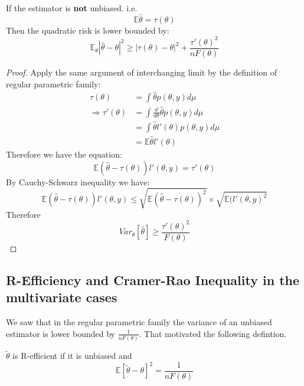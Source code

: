 \begin{corollary}
If the estimator is\textbf{ not} unbiased. i.e.
\begin{equation*}
	\mathbb{E}\hat{\theta} = \tau(\theta)
\end{equation*}
	Then the quadratic risk is lower bounded by:
	\begin{equation*}
		\mathbb{E}_\theta |\hat{\theta} - \theta |^2 \geq |\tau(\theta) - \theta|^2 + \frac{\tau'(\theta)^2}{n F(\theta)}
	\end{equation*}
\end{corollary}


\begin{proof}
	Apply the same argument of interchanging limit by the definition of regular parametric family:
	\begin{align*}
		\tau(\theta) &= \int \hat{\theta}p(\theta, y) d\mu\\
		\Rightarrow \tau'(\theta) &=\int \frac{d}{d\theta} \hat{\theta} p(\theta, y) d\mu\\
		&= \int \hat{\theta}l'(\theta)p(\theta, y) d\mu\\
		&= \mathbb{E} \hat{\theta}l'(\theta)
	\end{align*}
	Therefore we have the equation:
	\begin{equation}
		\mathbb{E}(\hat{\theta} - \tau(\theta))l'(\theta,y) = \tau'(\theta)
	\end{equation}
	By Cauchy-Schwarz inequality we have:
	\begin{equation*}
		\mathbb{E}(\hat{\theta} - \tau(\theta))l'(\theta, y) \leq \sqrt{\mathbb{E}(\hat{\theta} - \tau(\theta))^2} \times \sqrt{\mathbb{E}(l'(\theta, y)^2}
	\end{equation*}
	Therefore
	\begin{equation*}
		Var_\theta [\hat{\theta}] \geq \frac{\tau'(\theta)^2}{F(\theta)}
	\end{equation*}
\end{proof}


\subsection{R-Efficiency and Cramer-Rao Inequality in the multivariate cases}
We saw that in the regular parametric family the variance of an unbiased estimator is lower bounded by $\frac{1}{nF(\theta)}$. That motivated the following defintion.
\begin{definition}
	$\tilde{\theta}$ is R-efficient if it is unbiased and 
	\begin{equation}
		\mathbb{E}[\tilde{\theta} - \theta]^2 = \frac{1}{nF(\theta)}
 	\end{equation}
\end{definition}

